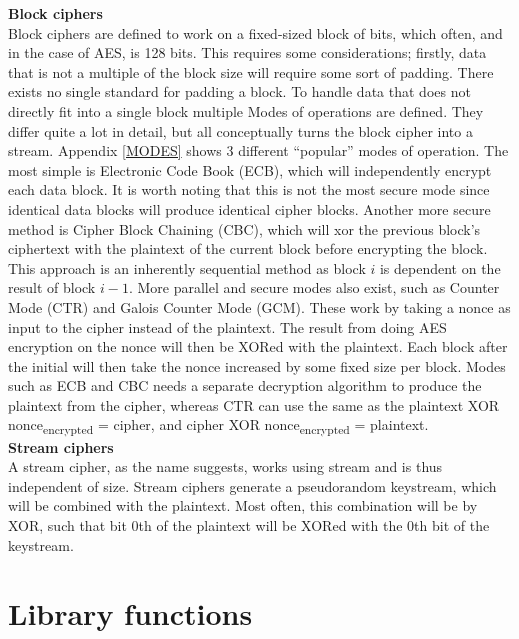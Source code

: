 \documentclass[a4paper, openany]{book}
\begin{document}
\textbf{Block ciphers}\\
Block ciphers are defined to work on a fixed-sized block of bits, which often, and in the case of AES, is 128 bits. This requires some considerations; firstly, data that is not a multiple of the block size will require some sort of padding. There exists no single standard for padding a block. To handle data that does not directly fit into a single block multiple Modes of operations are defined. They differ quite a lot in detail, but all conceptually turns the block cipher into a stream. Appendix \ref{MODES} shows 3 different ``popular'' modes of operation. The most simple is Electronic Code Book (ECB), which will independently encrypt each data block. It is worth noting that this is not the most secure mode since identical data blocks will produce identical cipher blocks. Another more secure method is Cipher Block Chaining (CBC), which will xor the previous block's ciphertext with the plaintext of the current block before encrypting the block. This approach is an inherently sequential method as block \(i\) is dependent on the result of block \(i-1\). More parallel and secure modes also exist, such as Counter Mode (CTR) and Galois Counter Mode (GCM). These work by taking a nonce as input to the cipher instead of the plaintext. The result from doing AES encryption on the nonce will then be XORed with the plaintext. Each block after the initial will then take the nonce increased by some fixed size per block. Modes such as ECB and CBC needs a separate decryption algorithm to produce the plaintext from the cipher, whereas CTR can use the same as the plaintext XOR nonce\textsubscript{encrypted} = cipher, and cipher XOR nonce\textsubscript{encrypted} = plaintext.\\

\textbf{Stream ciphers}\\
A stream cipher, as the name suggests, works using stream and is thus independent of size. Stream ciphers generate a pseudorandom keystream, which will be combined with the plaintext. Most often, this combination will be by XOR, such that bit 0th of the plaintext will be XORed with the 0th bit of the keystream.
\chapter{Library functions}
\label{sec:org20a6e40}
\end{document}

